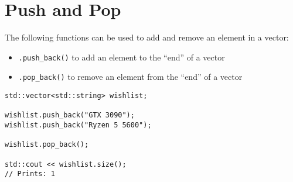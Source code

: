 \section{Push and Pop}
The following functions can be used to add and remove an element in a vector:

\begin{itemize}
    \item \verb!.push_back()! to add an element to the “end” of a vector
    \item \verb!.pop_back()! to remove an element from the “end” of a vector
\end{itemize}

\begin{verbatim}
std::vector<std::string> wishlist;
 
wishlist.push_back("GTX 3090");
wishlist.push_back("Ryzen 5 5600");
 
wishlist.pop_back();
 
std::cout << wishlist.size(); 
// Prints: 1    
\end{verbatim}

